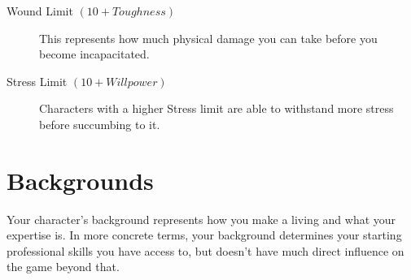 \begin{description}


    \item[Wound Limit $(10 + Toughness)$] 
    This represents how much physical damage you can take before you become incapacitated.
    
    \item[Stress Limit $(10 + Willpower)$] 
    Characters with a higher Stress limit are able to withstand more stress before succumbing to it.

\end{description}

\section{Backgrounds}
Your character's background represents how you make a living and what your expertise is.
In more concrete terms, your background determines your starting professional skills you have access to,
but doesn't have much direct influence on the game beyond that. 




